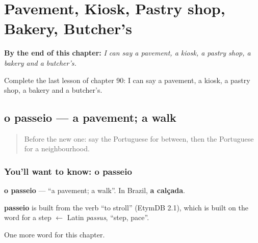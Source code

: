 
\chapter{Pavement, Kiosk, Pastry shop, Bakery, Butcher's}
\label{ch:pt-pavement-kiosk-pastry-shop-bakery-butcher-s}

\begin{chapteropening}
\textbf{By the end of this chapter:} \emph{I can say a pavement, a kiosk, a pastry shop, a bakery and a butcher's.}

Complete the last lesson of chapter 90: I can say a pavement, a kiosk, a pastry shop, a bakery and a butcher's.
\end{chapteropening}

\section[o passeio]{o passeio — a pavement; a walk}

\label{lesson:PT-C90-passeio}



\begin{quote}
Before the new one: say the Portuguese for between, then the Portuguese for a neighbourhood.
\end{quote}

\subsection*{You'll want to know: o passeio}
\textbf{o passeio} — \textquotedblleft{}a pavement; a walk\textquotedblright{}. In Brazil, \textbf{a calçada}.

\begin{cousinweb}
\textbf{passeio} is built from the verb \textquotedblleft{}to stroll\textquotedblright{} (EtymDB 2.1), which is built on the word for a step $\leftarrow$ Latin \emph{passus}, \textquotedblleft{}step, pace\textquotedblright{}.
\end{cousinweb}

\begin{grammarlens}[title={What you've built}]
One more word for this chapter.
\end{grammarlens}

